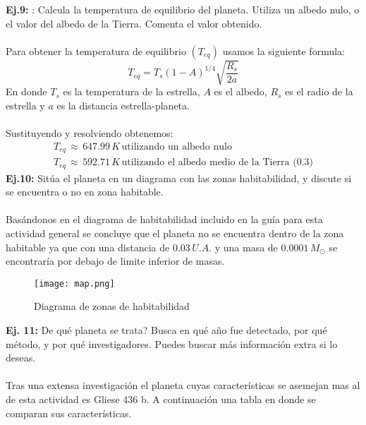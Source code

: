 \documentclass[12pt,letterpaper]{article}
\begin{document}
\textbf{Ej.9:} : Calcula la temperatura de equilibrio del planeta. Utiliza un albedo nulo, o el valor del albedo de la Tierra. Comenta el valor obtenido.\\\\
Para obtener la temperatura de equilibrio $(T_{eq})$ usamos la siguiente formula:
\begin{equation}
T_{eq}=T_s(1-A)^{1/4}\sqrt{\frac{R_s}{2a}}
\end{equation}
En donde $T_s$ es la temperatura de la estrella, $A$ es el albedo, $R_s$ es el radio de la estrella y $a$ es la distancia estrella-planeta.\\\\
Sustituyendo y resolviendo obtenemos:
\begin{gather}
T_{eq}\,\approx\,647.99\,K\,\text{utilizando un albedo nulo}\\
T_{eq}\,\approx\,592.71\,K\,\text{utilizando el albedo medio de la Tierra (0.3)}
\end{gather}
\textbf{Ej.10:} Sitúa el planeta en un diagrama con las zonas habitabilidad, y discute si se encuentra o no en zona habitable.\\\\
Basándonos en el diagrama de habitabilidad incluido en la guía para esta actividad general se concluye que el planeta no se encuentra dentro de la zona habitable ya que con una distancia de $0.03\,U.A.$ y una masa de $0.0001\,M_\odot$ se encontraría por debajo de limite inferior de masas.
\begin{figure}[H]
\centering
\texttt{[image: map.png]}
\caption{Diagrama de zonas de habitabilidad}
\label{fig:map}
\end{figure}
\textbf{Ej. 11:} De qué planeta se trata? Busca en qué año fue detectado, por qué método, y por qué investigadores. Puedes buscar más información extra si lo deseas.\\\\
Tras una extensa investigación el planeta cuyas características se asemejan mas al de esta actividad es Gliese 436 b. A continuación una tabla en donde se comparan sus características.
\end{document}
